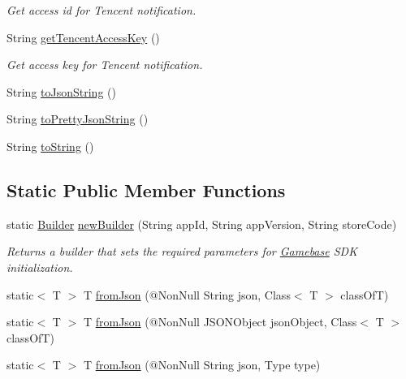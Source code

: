 \begin{DoxyCompactItemize}
\begin{DoxyCompactList}\small\item\em Get access id for Tencent notification. \end{DoxyCompactList}\item 
String \hyperlink{classcom_1_1toast_1_1android_1_1gamebase_1_1_gamebase_configuration_ac3f77aa86c99c8d53555859211a9f76d}{get\+Tencent\+Access\+Key} ()
\begin{DoxyCompactList}\small\item\em Get access key for Tencent notification. \end{DoxyCompactList}\item 
String \hyperlink{classcom_1_1toast_1_1android_1_1gamebase_1_1base_1_1_value_object_a58acf6402880e9769d79d8667581fa6a}{to\+Json\+String} ()
\item 
String \hyperlink{classcom_1_1toast_1_1android_1_1gamebase_1_1base_1_1_value_object_a054431f3d988a22295cfc8b784ff2637}{to\+Pretty\+Json\+String} ()
\item 
String \hyperlink{classcom_1_1toast_1_1android_1_1gamebase_1_1base_1_1_value_object_ad146fa8579a5f8a876c4688cc5a68520}{to\+String} ()
\end{DoxyCompactItemize}
\subsection*{Static Public Member Functions}
\begin{DoxyCompactItemize}
\item 
static \hyperlink{classcom_1_1toast_1_1android_1_1gamebase_1_1_gamebase_configuration_1_1_builder}{Builder} \hyperlink{classcom_1_1toast_1_1android_1_1gamebase_1_1_gamebase_configuration_a7c28786c8e446dd54cb5f4d0797b6564}{new\+Builder} (String app\+Id, String app\+Version, String store\+Code)
\begin{DoxyCompactList}\small\item\em Returns a builder that sets the required parameters for \hyperlink{classcom_1_1toast_1_1android_1_1gamebase_1_1_gamebase}{Gamebase} S\+DK initialization. \end{DoxyCompactList}\item 
static$<$ T $>$ T \hyperlink{classcom_1_1toast_1_1android_1_1gamebase_1_1base_1_1_value_object_ae6655c88c20a9a8406dc11b46250ac7b}{from\+Json} (@Non\+Null String json, Class$<$ T $>$ class\+OfT)
\item 
static$<$ T $>$ T \hyperlink{classcom_1_1toast_1_1android_1_1gamebase_1_1base_1_1_value_object_ab83c4196ee2e3f11553bbe0f04dc2101}{from\+Json} (@Non\+Null J\+S\+O\+N\+Object json\+Object, Class$<$ T $>$ class\+OfT)
\item 
static$<$ T $>$ T \hyperlink{classcom_1_1toast_1_1android_1_1gamebase_1_1base_1_1_value_object_aa901d97d495150b54bcb80c05672f58a}{from\+Json} (@Non\+Null String json, Type type)
\end{DoxyCompactItemize}


